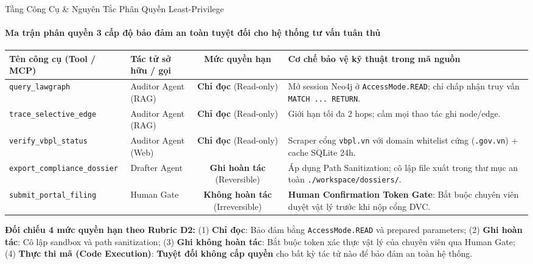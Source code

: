 \documentclass[aspectratio=169,10pt,xcolor={table}]{beamer}
\begin{document}
\begin{frame}{Tầng Công Cụ \& Nguyên Tắc Phân Quyền Least-Privilege}
\framesubtitle{Ma trận phân quyền 3 cấp độ bảo đảm an toàn tuyệt đối cho hệ thống tư vấn tuân thủ}
\centering
\small
\begin{tabularx}{0.98\linewidth}{@{}p{3.5cm} p{2.4cm} c X@{}}
\toprule
\textbf{Tên công cụ (Tool / MCP)} & \textbf{Tác tử sở hữu / gọi} & \textbf{Mức quyền hạn} & \textbf{Cơ chế bảo vệ kỹ thuật trong mã nguồn} \\ \midrule
\texttt{query\_lawgraph} & Auditor Agent (RAG) & \textbf{\color{darkgreen}Chỉ đọc} (Read-only) & Mở session Neo4j ở \texttt{AccessMode.READ}; chỉ chấp nhận truy vấn \texttt{MATCH ... RETURN}. \\
\texttt{trace\_selective\_edge} & Auditor Agent (RAG) & \textbf{\color{darkgreen}Chỉ đọc} (Read-only) & Giới hạn tối đa 2 hops; cấm mọi thao tác ghi node/edge. \\
\texttt{verify\_vbpl\_status} & Auditor Agent (Web) & \textbf{\color{darkgreen}Chỉ đọc} (Read-only) & Scraper cổng \texttt{vbpl.vn} với domain whitelist cứng (\texttt{.gov.vn}) + cache SQLite 24h. \\
\texttt{export\_compliance\_dossier}& Drafter Agent & \textbf{\color{alertorange}Ghi hoàn tác} (Reversible) & Áp dụng Path Sanitization; cô lập file xuất trong thư mục an toàn \texttt{./workspace/dossiers/}. \\
\texttt{submit\_portal\_filing} & Human Gate & \textbf{\color{darkred}Không hoàn tác} (Irreversible) & \textbf{Human Confirmation Token Gate}: Bắt buộc chuyên viên duyệt vật lý trước khi nộp cổng DVC. \\
\bottomrule
\end{tabularx}
\vskip0.15cm
\begin{tcolorbox}[colback=hcmutgray,colframe=hcmutblue!60,boxrule=0.5pt,top=2pt,bottom=2pt,left=4pt,right=4pt]
\scriptsize\textbf{Đối chiếu 4 mức quyền hạn theo Rubric D2:} (1) \textbf{Chỉ đọc}: Bảo đảm bằng \texttt{AccessMode.READ} và prepared parameters; (2) \textbf{Ghi hoàn tác}: Cô lập sandbox và path sanitization; (3) \textbf{Ghi không hoàn tác}: Bắt buộc token xác thực vật lý của chuyên viên qua Human Gate; (4) \textbf{Thực thi mã (Code Execution)}: \textbf{Tuyệt đối không cấp quyền} cho bất kỳ tác tử nào để bảo đảm an toàn hệ thống.
\end{tcolorbox}
\end{frame}
\end{document}
